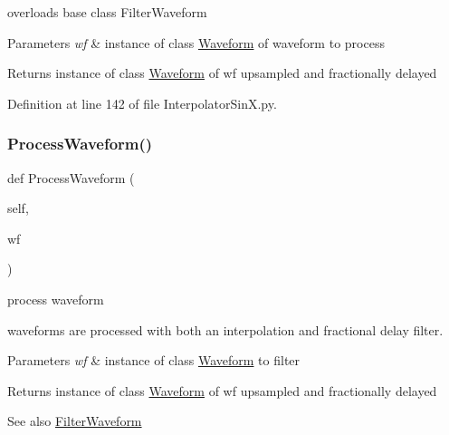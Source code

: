 overloads base class Filter\+Waveform 


\begin{DoxyParams}{Parameters}
{\em wf} & instance of class \hyperlink{namespaceSignalIntegrity_1_1TimeDomain_1_1Waveform}{Waveform} of waveform to process \\
\hline
\end{DoxyParams}
\begin{DoxyReturn}{Returns}
instance of class \hyperlink{namespaceSignalIntegrity_1_1TimeDomain_1_1Waveform}{Waveform} of wf upsampled and fractionally delayed 
\end{DoxyReturn}


Definition at line 142 of file Interpolator\+Sin\+X.\+py.

\mbox{\label{classSignalIntegrity_1_1TimeDomain_1_1Filters_1_1InterpolatorSinX_1_1InterpolatorFractionalDelayFilterSinX_ae09bec195c9cb1d5819e73b7be169b11}} 
\subsubsection{\texorpdfstring{Process\+Waveform()}{ProcessWaveform()}}
{\footnotesize\ttfamily def Process\+Waveform (\begin{DoxyParamCaption}\item[{}]{self,  }\item[{}]{wf }\end{DoxyParamCaption})}



process waveform 

waveforms are processed with both an interpolation and fractional delay filter.


\begin{DoxyParams}{Parameters}
{\em wf} & instance of class \hyperlink{namespaceSignalIntegrity_1_1TimeDomain_1_1Waveform}{Waveform} to filter \\
\hline
\end{DoxyParams}
\begin{DoxyReturn}{Returns}
instance of class \hyperlink{namespaceSignalIntegrity_1_1TimeDomain_1_1Waveform}{Waveform} of wf upsampled and fractionally delayed
\end{DoxyReturn}
\begin{DoxySeeAlso}{See also}
\hyperlink{classSignalIntegrity_1_1TimeDomain_1_1Filters_1_1InterpolatorSinX_1_1InterpolatorFractionalDelayFilterSinX_a84e73c18250ca4a61482f94ad61e735b}{Filter\+Waveform} 
\end{DoxySeeAlso}


